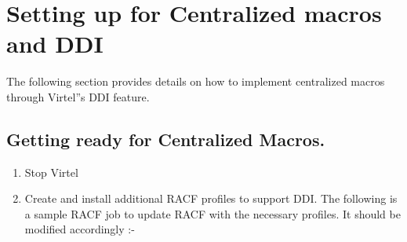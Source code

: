 \documentclass[letterpaper,10pt,english]{sphinxmanual}
\begin{document}
\begin{sphinxVerbatim}[commandchars=\\\{\}]

  
          
   
\end{sphinxVerbatim}


\chapter{Setting up for Centralized macros and DDI}
\label{\detokenize{TN202002:setting-up-for-centralized-macros-and-ddi}}
The following section provides details on how to implement centralized macros through Virtel”s DDI feature.


\section{Getting ready for Centralized Macros.}
\label{\detokenize{TN202002:getting-ready-for-centralized-macros}}\begin{enumerate}
\def\theenumi{\arabic{enumi}}
\def\labelenumi{\theenumi .}
\makeatletter\def\p@enumii{\p@enumi \theenumi .}\makeatother
\item {} 
Stop Virtel

\item {} 
Create and install additional RACF profiles to support DDI. The following is a sample RACF job to update RACF with the necessary profiles. It should be modified accordingly :-

\end{enumerate}
\end{document}
